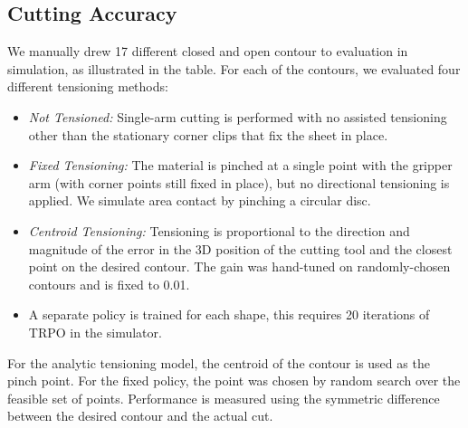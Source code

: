 \subsection*{Cutting Accuracy}
\label{sec:policyeval}
We manually drew 17 different closed and open contour to evaluation in simulation, as illustrated in the table. 
For each of the contours, we evaluated four different tensioning methods:
\begin{itemize}
\item \emph{Not Tensioned:} Single-arm cutting is performed with no assisted tensioning other than the stationary corner clips that fix the sheet in place.
\item \emph{Fixed Tensioning:} The material is pinched at a single point with the gripper arm (with corner points still fixed in place), but no directional tensioning is applied. We simulate area contact by pinching a circular disc.
\item \emph{Centroid Tensioning:} Tensioning is proportional to the direction and magnitude of the error in the  3D position of the cutting tool and the closest point on the desired contour. The gain was hand-tuned on randomly-chosen contours and is fixed to 0.01.
\item \emph{\tpsalgo }  A separate policy is trained for each shape, this requires 20 iterations of TRPO in the simulator.
\end{itemize}

\vspace{0.5em}

For the analytic tensioning model, the centroid of the contour is used as the pinch point. For the fixed policy, the point was chosen by random search over the feasible set of points.
Performance is measured using the symmetric difference between the desired contour and the actual cut.

